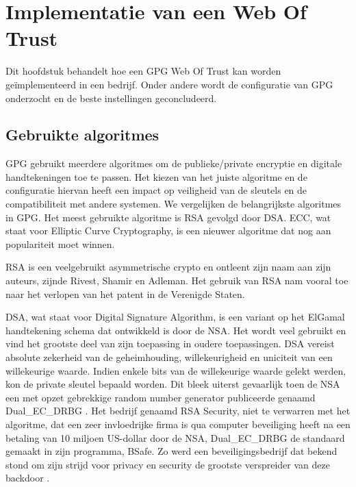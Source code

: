 \chapter{Implementatie van een  Web Of Trust}
\label{ch:implementatie-van-een-gpg-web-of-trust}

Dit hoofdstuk behandelt hoe een \gls{GPG} Web Of Trust kan worden
geïmplementeerd in
een bedrijf. Onder andere wordt de configuratie van \gls{GPG} onderzocht en
de beste
instellingen geconcludeerd.

\section{Gebruikte algoritmes}
\label{sec:gebruikte-algoritmes}

\gls{GPG} gebruikt meerdere algoritmes om de publieke/private encryptie en
digitale
handtekeningen toe te passen. Het kiezen van het juiste algoritme en de
configuratie hiervan heeft een impact op veiligheid van de sleutels en de
compatibiliteit met andere systemen. We vergelijken de belangrijkste algoritmes
in \gls{GPG}. Het meest gebruikte algoritme is RSA gevolgd door DSA. ECC, wat
staat
voor Elliptic Curve Cryptography, is een nieuwer algoritme dat nog aan
populariteit moet winnen.

RSA is een veelgebruikt asymmetrische crypto en ontleent zijn naam aan zijn
auteurs, zijnde Rivest, Shamir en Adleman. Het gebruik van RSA nam vooral toe
naar het verlopen van het patent in de Verenigde Staten.

DSA, wat staat voor Digital Signature Algorithm, is een variant op het ElGamal
handtekening schema dat ontwikkeld is door de NSA. Het wordt veel gebruikt en
vind het grootste deel van zijn toepassing in oudere toepassingen. DSA vereist
absolute zekerheid van de geheimhouding, willekeurigheid en uniciteit van een
willekeurige waarde. Indien enkele bits van de willekeurige waarde gelekt
werden, kon de private sleutel bepaald worden. Dit bleek uiterst gevaarlijk toen
de NSA een met opzet gebrekkige random number generator publiceerde genaamd
Dual\_EC\_DRBG \autocite{Perlroth2013NsaRng, Zetter2013NsaRng, GuardianNsaRng}.
Het bedrijf genaamd RSA Security, niet te verwarren met het algoritme, dat een
zeer invloedrijke firma is qua computer beveiliging heeft na een betaling van 10
miljoen US-dollar door de NSA, Dual\_EC\_DRBG de standaard gemaakt in zijn
programma, BSafe. Zo werd een beveiligingsbedrijf dat bekend stond om zijn
strijd voor privacy en security de grootste verspreider van deze backdoor
\autocite{Menn2013NsaRsa}.

